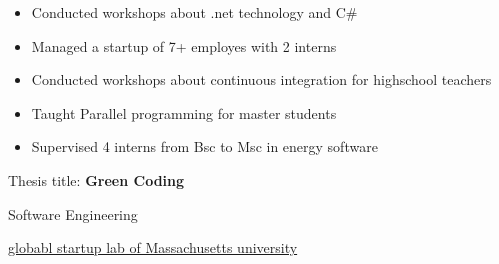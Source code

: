 \documentclass[10pt,a4paper,ragged2e,withhyper]{altacv}
\begin{document}
\begin{paracol}{2}










  \medskip

  \medskip
  \begin{itemize}
    \item Conducted workshops about .net technology and C\#
    \item Managed a startup of 7+ employes with 2 interns
    \item Conducted workshops about continuous integration for highschool teachers
    \item Taught Parallel programming for master students
    \item Supervised 4 interns from Bsc to Msc in energy software
  \end{itemize}

  \switchcolumn



  \medskip

  Thesis title: \textbf{Green Coding}

  \divider

  Software Engineering

  \divider

  \href{https://gsl.mit.edu/mit-global-startup-labs}{globabl startup lab of Massachusetts university}

  \medskip


\end{paracol}
\end{document}
